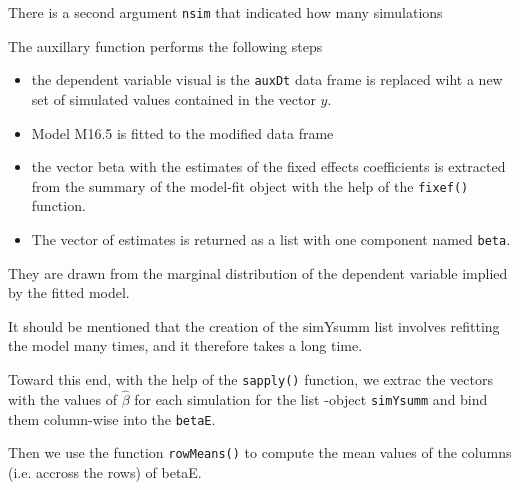 \documentclass[a4paper,12pt]{article}
\begin{document}
There is a second argument \texttt{nsim} that indicated how many simulations 

The auxillary function performs the following steps

\begin{itemize}
\item the dependent variable visual is the \texttt{auxDt} data frame is replaced wiht a new set of simulated values contained in the vector $y$.
\item Model M16.5 is fitted to the modified data frame
\item the vector beta with the estimates of the fixed effects coefficients is extracted from the summary of the model-fit object with the help of the \texttt{fixef()} function.
\item The vector of estimates is returned as a list with one component named \texttt{beta}.
\end{itemize}

They are drawn from the marginal distribution of the dependent variable implied by the fitted model.



It should be mentioned that the creation of the simYsumm list involves refitting the model many times, and it therefore takes a long time.

Toward this end, with the help of the \texttt{sapply()} function, we extrac the vectors with the values of $\hat{\beta}$ for each simulation for the list
-object \texttt{simYsumm} and bind them column-wise into the \texttt{betaE}.

Then we use the function \texttt{rowMeans()} to compute the mean values of the columns (i.e. accross the rows) of betaE.



\end{document}
